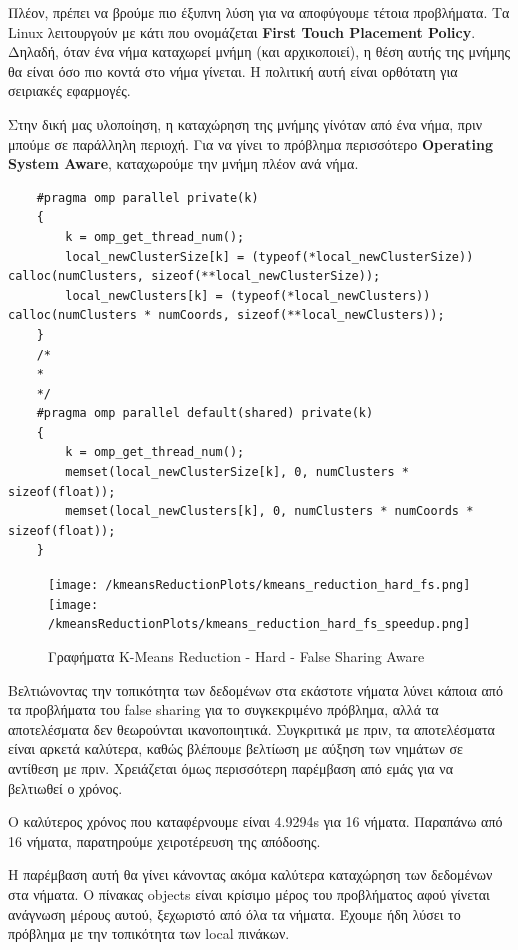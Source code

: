 \documentclass[../final_report.tex]{subfiles}
\begin{document}
Πλέον, πρέπει να βρούμε πιο έξυπνη λύση για να αποφύγουμε τέτοια προβλήματα. Τα Linux λειτουργούν με κάτι που ονομάζεται
\textbf{First Touch Placement Policy}. Δηλαδή, όταν ένα νήμα καταχωρεί μνήμη (και αρχικοποιεί), η θέση αυτής της μνήμης θα είναι όσο πιο κοντά στο νήμα γίνεται.
Η πολιτική αυτή είναι ορθότατη για σειριακές εφαρμογές.

Στην δική μας υλοποίηση, η καταχώρηση της μνήμης γίνόταν από ένα νήμα, πριν μπούμε σε παράλληλη περιοχή. Για να γίνει το πρόβλημα
περισσότερο \textbf{Operating System Aware}, καταχωρούμε την μνήμη πλέον ανά νήμα.

\begin{lstlisting}
    #pragma omp parallel private(k)
    {
        k = omp_get_thread_num();
        local_newClusterSize[k] = (typeof(*local_newClusterSize)) calloc(numClusters, sizeof(**local_newClusterSize));
        local_newClusters[k] = (typeof(*local_newClusters)) calloc(numClusters * numCoords, sizeof(**local_newClusters));
    }
    /*
    *
    */
    #pragma omp parallel default(shared) private(k)
    {
        k = omp_get_thread_num();
        memset(local_newClusterSize[k], 0, numClusters * sizeof(float));
        memset(local_newClusters[k], 0, numClusters * numCoords * sizeof(float));
    }
\end{lstlisting}

\begin{figure}[H]
    \centering
    \texttt{[image: /kmeansReductionPlots/kmeans\_reduction\_hard\_fs.png]}
    \texttt{[image: /kmeansReductionPlots/kmeans\_reduction\_hard\_fs\_speedup.png]}
    \caption{Γραφήματα K-Means Reduction - Hard - False Sharing Aware}
    \label{fig:Γραφήματα K-Means Reduction - Hard - False Sharing Aware}
\end{figure}

Βελτιώνοντας την τοπικότητα των δεδομένων στα εκάστοτε νήματα λύνει κάποια από τα προβλήματα του false sharing για το 
συγκεκριμένο πρόβλημα, αλλά τα αποτελέσματα δεν θεωρούνται ικανοποιητικά. 
Συγκριτικά με πριν, τα αποτελέσματα είναι αρκετά καλύτερα, καθώς βλέπουμε βελτίωση με αύξηση των νημάτων σε αντίθεση με πριν.
Χρειάζεται όμως περισσότερη παρέμβαση από εμάς για να βελτιωθεί ο χρόνος.

Ο καλύτερος χρόνος που καταφέρνουμε είναι 4.9294s για 16 νήματα. Παραπάνω από 16 νήματα, παρατηρούμε χειροτέρευση
της απόδοσης.

Η παρέμβαση αυτή θα γίνει κάνοντας ακόμα καλύτερα καταχώρηση των δεδομένων στα νήματα. Ο πίνακας objects είναι κρίσιμο μέρος
του προβλήματος αφού γίνεται ανάγνωση μέρους αυτού, ξεχωριστό από όλα τα νήματα. Έχουμε ήδη λύσει το πρόβλημα με την τοπικότητα
των local πινάκων.
\end{document}
